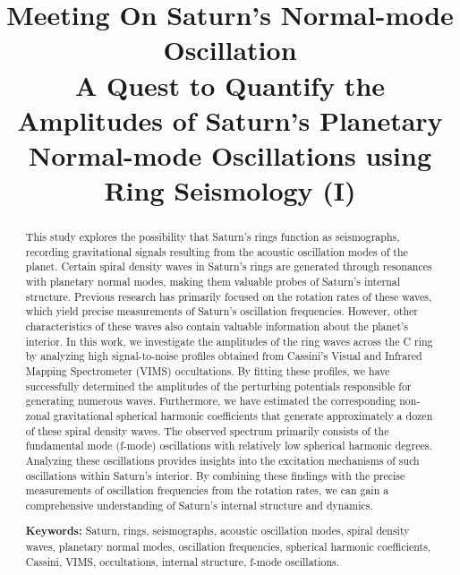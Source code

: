 \documentclass{article}
\title{Meeting On Saturn's Normal-mode Oscillation \\[0.5ex] \large A Quest to Quantify the Amplitudes of Saturn's Planetary Normal-mode Oscillations using Ring Seismology (I)}
\begin{document}
\maketitle

\begin{abstract}
This study explores the possibility that Saturn's rings function as seismographs, recording gravitational signals resulting from the acoustic oscillation modes of the planet. Certain spiral density waves in Saturn's rings are generated through resonances with planetary normal modes, making them valuable probes of Saturn's internal structure. Previous research has primarily focused on the rotation rates of these waves, which yield precise measurements of Saturn's oscillation frequencies. However, other characteristics of these waves also contain valuable information about the planet's interior. In this work, we investigate the amplitudes of the ring waves across the C ring by analyzing high signal-to-noise profiles obtained from Cassini's Visual and Infrared Mapping Spectrometer (VIMS) occultations. By fitting these profiles, we have successfully determined the amplitudes of the perturbing potentials responsible for generating numerous waves. Furthermore, we have estimated the corresponding non-zonal gravitational spherical harmonic coefficients that generate approximately a dozen of these spiral density waves. The observed spectrum primarily consists of the fundamental mode (f-mode) oscillations with relatively low spherical harmonic degrees. Analyzing these oscillations provides insights into the excitation mechanisms of such oscillations within Saturn's interior. By combining these findings with the precise measurements of oscillation frequencies from the rotation rates, we can gain a comprehensive understanding of Saturn's internal structure and dynamics.

\vspace{0.3cm}

\textbf{Keywords:} Saturn, rings, seismographs, acoustic oscillation modes, spiral density waves, planetary normal modes, oscillation frequencies, spherical harmonic coefficients, Cassini, VIMS, occultations, internal structure, f-mode oscillations.

\end{abstract}

\end{document}

